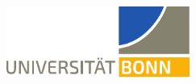\begin{titlepage}
    
    
	\begin{addmargin}[-1cm]{-3cm}
    \begin{center}
        \large
        
		\begin{flushleft}
		\includegraphics[width=6cm]{gfx/logo/unilogobonn}
		\end{flushleft}
       
        \vfill

        \begingroup
            \color{CTtitle}\spacedallcaps{\large \textbf{\myTitle}} \\ \bigskip
        \endgroup
        \vfill

        \begingroup
         \\ \smallskip
        
         \\ \smallskip
        
        \spacedallcaps{\myName} \\ \smallskip
        
         \\ \smallskip
        
        \spacedallcaps{\large \myDepartment} \\ \vspace{1.5cm}
        
         \\ \smallskip
        \spacedallcaps{\myProf}  \\ \smallskip
        \spacedallcaps{\mySupervisor}
        

\end{center}
\end{addmargin}
\end{titlepage}
